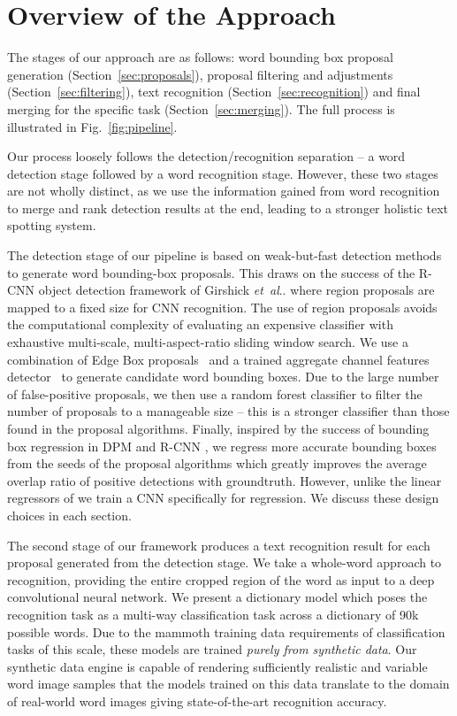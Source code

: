\documentclass[twocolumn]{svjour3}          \smartqed  \usepackage{epsfig}
\makeatletter
\DeclareRobustCommand\onedot{\futurelet\@let@token\@onedot}
\def\@onedot{\ifx\@let@token.\else.\null\fi\xspace}
\def\etal{\emph{et~al}\onedot}
\makeatother
\begin{document}
\section{Overview of the Approach}
\label{sec:approach}

The stages of our approach are as follows: word bounding box proposal generation (Section~\ref{sec:proposals}), proposal filtering and adjustments (Section~\ref{sec:filtering}), text recognition (Section~\ref{sec:recognition}) and final merging for the specific task (Section~\ref{sec:merging}). The full process is illustrated in Fig.~\ref{fig:pipeline}.


Our process loosely follows the detection/recognition separation -- a word detection stage followed by a word recognition stage. However, these two stages are not wholly distinct, as we use the information gained from word recognition to merge and rank detection results at the end, leading to a stronger holistic text spotting system.

The detection stage of our pipeline is based on weak-but-fast detection methods to generate word bounding-box proposals. This draws on the success of the R-CNN object detection framework of Girshick \etal \cite{Girshick14} where region proposals are mapped to a fixed size for CNN recognition. The use of region proposals avoids the computational complexity of evaluating an expensive classifier with exhaustive multi-scale, multi-aspect-ratio sliding window search. We use a combination of Edge Box proposals~\cite{Zitnick14} and a trained aggregate channel features detector~\cite{Dollar14} to generate candidate word bounding boxes. Due to the large number of false-positive proposals, we then use a random forest classifier to filter the number of proposals to a manageable size -- this is a stronger classifier than those found in the proposal algorithms. Finally, inspired by the success of bounding box regression in DPM \cite{Felzenszwalb10a} and R-CNN \cite{Girshick14}, we regress more accurate bounding boxes from the seeds of the proposal algorithms which greatly improves the average overlap ratio of positive detections with groundtruth. However, unlike the linear regressors of \cite{Felzenszwalb10a,Girshick14} we train a CNN specifically for regression. We discuss these design choices in each section.

The second stage of our framework produces a text recognition result for each proposal generated from the detection stage. We take a whole-word approach to recognition, providing the entire cropped region of the word as input to a deep convolutional neural network. We present a dictionary model which poses the recognition task as a multi-way classification task across a dictionary of 90k possible words. Due to the mammoth training data requirements of classification tasks of this scale, these models are trained \emph{purely from synthetic data}. Our synthetic data engine is capable of rendering sufficiently realistic and variable word image samples that the models trained on this data translate to the domain of real-world word images giving state-of-the-art recognition accuracy. 
\end{document}
